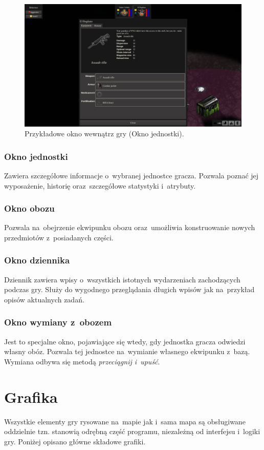 \documentclass[licencjacka]{pracamgr}
\begin{document}
      \begin{figure}[htbp]
	\centering
	\includegraphics[scale=0.22]{Window.png}
	\caption{Przykładowe okno wewnątrz gry (Okno jednostki).}
      \end{figure}

      \subsubsection{Okno jednostki}
	Zawiera szczegółowe informacje o~wybranej jednostce gracza. Pozwala poznać jej wyposażenie, historię oraz~szczegółowe statystyki i~atrybuty.
      \subsubsection{Okno obozu}
	Pozwala na~obejrzenie ekwipunku obozu oraz~umożliwia konstruowanie nowych przedmiotów z~posiadanych części.
      \subsubsection{Okno dziennika}
	Dziennik zawiera wpisy o~wszystkich istotnych wydarzeniach zachodzących podczas gry. Służy do wygodnego przeglądania długich wpisów jak na~przykład
	opisów aktualnych zadań.
      \subsubsection{Okno wymiany z~obozem}
	Jest to specjalne okno, pojawiające się wtedy, gdy jednostka gracza odwiedzi własny obóz. Pozwala tej jednostce na~wymianie własnego ekwipunku z~bazą.
	Wymiana odbywa się metodą \emph{przeciągnij i~upuść}.


  \section{Grafika}
    Wszystkie elementy gry rysowane na~mapie jak i~sama mapa są obsługiwane oddzielnie tzn. stanowią odrębną część programu, niezależną od interfejsu i~logiki gry.
    Poniżej opisano główne składowe grafiki.
\end{document}
